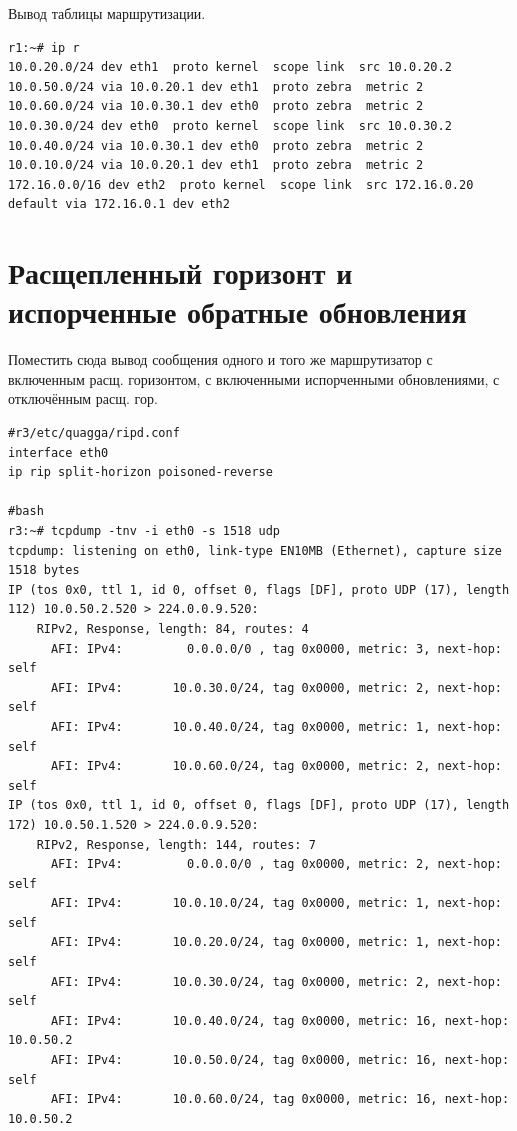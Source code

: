 \documentclass[a4paper,12pt]{article}
\begin{document}
Вывод таблицы маршрутизации.

\begin{Verbatim}
r1:~# ip r
10.0.20.0/24 dev eth1  proto kernel  scope link  src 10.0.20.2 
10.0.50.0/24 via 10.0.20.1 dev eth1  proto zebra  metric 2 
10.0.60.0/24 via 10.0.30.1 dev eth0  proto zebra  metric 2 
10.0.30.0/24 dev eth0  proto kernel  scope link  src 10.0.30.2 
10.0.40.0/24 via 10.0.30.1 dev eth0  proto zebra  metric 2 
10.0.10.0/24 via 10.0.20.1 dev eth1  proto zebra  metric 2 
172.16.0.0/16 dev eth2  proto kernel  scope link  src 172.16.0.20 
default via 172.16.0.1 dev eth2 
\end{Verbatim}


\section{Расщепленный горизонт и испорченные обратные обновления}

Поместить сюда вывод сообщения одного и того же маршрутизатор с включенным расщ. горизонтом, с включенными испорченными обновлениями, с отключённым расщ. гор.

\begin{Verbatim}
#r3/etc/quagga/ripd.conf
interface eth0
ip rip split-horizon poisoned-reverse

#bash
r3:~# tcpdump -tnv -i eth0 -s 1518 udp
tcpdump: listening on eth0, link-type EN10MB (Ethernet), capture size 1518 bytes
IP (tos 0x0, ttl 1, id 0, offset 0, flags [DF], proto UDP (17), length 112) 10.0.50.2.520 > 224.0.0.9.520: 
	RIPv2, Response, length: 84, routes: 4
	  AFI: IPv4:         0.0.0.0/0 , tag 0x0000, metric: 3, next-hop: self
	  AFI: IPv4:       10.0.30.0/24, tag 0x0000, metric: 2, next-hop: self
	  AFI: IPv4:       10.0.40.0/24, tag 0x0000, metric: 1, next-hop: self
	  AFI: IPv4:       10.0.60.0/24, tag 0x0000, metric: 2, next-hop: self
IP (tos 0x0, ttl 1, id 0, offset 0, flags [DF], proto UDP (17), length 172) 10.0.50.1.520 > 224.0.0.9.520: 
	RIPv2, Response, length: 144, routes: 7
	  AFI: IPv4:         0.0.0.0/0 , tag 0x0000, metric: 2, next-hop: self
	  AFI: IPv4:       10.0.10.0/24, tag 0x0000, metric: 1, next-hop: self
	  AFI: IPv4:       10.0.20.0/24, tag 0x0000, metric: 1, next-hop: self
	  AFI: IPv4:       10.0.30.0/24, tag 0x0000, metric: 2, next-hop: self
	  AFI: IPv4:       10.0.40.0/24, tag 0x0000, metric: 16, next-hop: 10.0.50.2
	  AFI: IPv4:       10.0.50.0/24, tag 0x0000, metric: 16, next-hop: self
	  AFI: IPv4:       10.0.60.0/24, tag 0x0000, metric: 16, next-hop: 10.0.50.2
\end{Verbatim}
\end{document}

